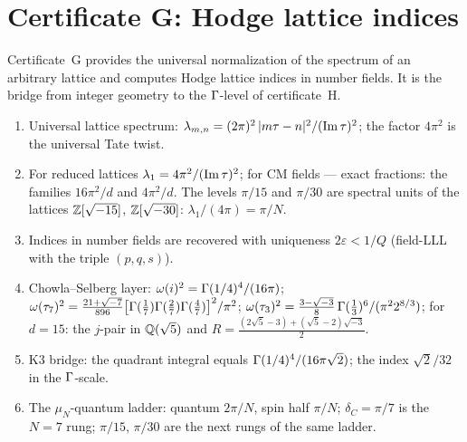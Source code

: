 \section{Certificate G: Hodge lattice indices}\label{sec:certG}

Certificate~G provides the universal normalization of the spectrum
of an arbitrary lattice and computes Hodge lattice indices in number
fields. It is the bridge from integer geometry to the $\Gamma$-level of
certificate~H.

\begin{theorem}[G1--G6]\label{th:certG}
\begin{enumerate}[leftmargin=2em, itemsep=0.15em]
\item[(G1)] Universal lattice spectrum:
  $\lambda_{m,n}=(2\pi)^2\,|m\tau-n|^2/(\operatorname{Im}\tau)^2$; the factor
  $4\pi^2$ is the universal Tate twist.
\item[(G2)] For reduced lattices $\lambda_1=4\pi^2/(\operatorname{Im}\tau)^2$;
  for CM fields --- exact fractions: the families $16\pi^2/d$ and
  $4\pi^2/d$. The levels $\pi/15$ and $\pi/30$ are spectral units of
  the lattices $\mathbb{Z}[\sqrt{-15}]$, $\mathbb{Z}[\sqrt{-30}]$:
  $\lambda_1/(4\pi)=\pi/N$.
\item[(G3)] Indices in number fields are recovered with uniqueness
  $2\varepsilon<1/Q$ (field-LLL with the triple $(p,q,s)$).
\item[(G4)] Chowla--Selberg layer: $\omega(i)^2=\Gamma(1/4)^4/(16\pi)$;
  $\omega(\tau_7)^2=\tfrac{21+\sqrt{-7}}{896}
  \bigl[\Gamma(\tfrac17)\Gamma(\tfrac27)\Gamma(\tfrac47)\bigr]^2/\pi^2$;
  $\omega(\tau_3)^2=\tfrac{3-\sqrt{-3}}{8}\,
  \Gamma(\tfrac13)^6/(\pi^2 2^{8/3})$; for $d=15$: the $j$-pair in
  $\mathbb{Q}(\sqrt5)$ and $R=\tfrac{(2\sqrt5-3)+(\sqrt5-2)\sqrt{-3}}{2}$.
\item[(G5)] K3 bridge: the quadrant integral equals
  $\Gamma(1/4)^4/(16\pi\sqrt2)$; the index $\sqrt2/32$ in the
  $\Gamma$-scale.
\item[(G6)] The $\mu_N$-quantum ladder: quantum $2\pi/N$, spin half
  $\pi/N$; $\delta_C=\pi/7$ is the $N=7$ rung; $\pi/15$, $\pi/30$
  are the next rungs of the same ladder.
\end{enumerate}
\end{theorem}

